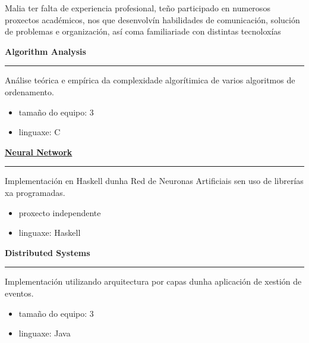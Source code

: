 \documentclass [10pt, a4paper] {extarticle}
\newcommand{\rightcolumwidth}{ 0.82 }
\begin{document}
    \begin {flushright}
    \begin {minipage} [t] {\rightcolumwidth\textwidth}
        Malia ter falta de experiencia profesional, teño participado en numerosos proxectos académicos, nos que desenvolvín habilidades de comunicación, solución de problemas e organización, así coma familiariade con distintas tecnoloxías \\ [7px]
        \begin {minipage} [t] {0.3\textwidth}
            \textbf {Algorithm Analysis} \\ [-5px]
            \hrule
            \hspace* {2px} Análise teórica e empírica da complexidade algorítimica de varios algoritmos de ordenamento.
            \vspace {-5px}
            \begin {itemize} [noitemsep]
            \item tamaño do equipo: 3
            \item linguaxe: C
            \end {itemize}
        \end {minipage}
        \hfill
        \begin {minipage} [t] {0.3\textwidth}
            \href {https://github.com/yref-boop/ann} {\textbf {Neural Network}} \\ [-5px]
            \hrule
            \vspace {4px} Implementación en Haskell dunha Red de Neuronas Artificiais sen uso de librerías xa programadas.
            \vspace {-5px}
                \begin {itemize} [noitemsep]
                \item proxecto independente
                \item linguaxe: Haskell
            \end {itemize}
        \end {minipage}
        \hfill
        \begin {minipage} [t] {0.3\textwidth}
            \textbf {Distributed Systems} \\ [-5px]
            \hrule
            \vspace {4px} Implementación utilizando arquitectura por capas dunha aplicación de xestión de eventos.
            \vspace {-5px}
            \begin {itemize} [noitemsep]
                \item tamaño do equipo: 3
                \item linguaxe: Java
            \end {itemize}
        \end {minipage}
    \end {minipage}
    \end {flushright}
\end{document}
